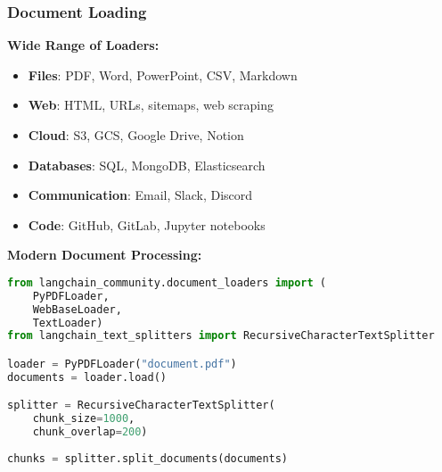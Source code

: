 \begin{frame}[fragile]\frametitle{Document Loading}

\textbf{Wide Range of Loaders:}
\begin{itemize}
\item \textbf{Files}: PDF, Word, PowerPoint, CSV, Markdown
\item \textbf{Web}: HTML, URLs, sitemaps, web scraping
\item \textbf{Cloud}: S3, GCS, Google Drive, Notion
\item \textbf{Databases}: SQL, MongoDB, Elasticsearch
\item \textbf{Communication}: Email, Slack, Discord
\item \textbf{Code}: GitHub, GitLab, Jupyter notebooks
\end{itemize}

\textbf{Modern Document Processing:}
\begin{lstlisting}[language=python, basicstyle=\tiny]
from langchain_community.document_loaders import (
    PyPDFLoader,
    WebBaseLoader,
    TextLoader)
from langchain_text_splitters import RecursiveCharacterTextSplitter

loader = PyPDFLoader("document.pdf")
documents = loader.load()

splitter = RecursiveCharacterTextSplitter(
    chunk_size=1000,
    chunk_overlap=200)
	
chunks = splitter.split_documents(documents)
\end{lstlisting}

\end{frame}

